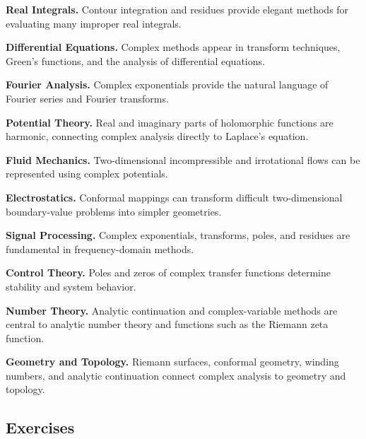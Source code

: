 \begin{applicationbox}
\textbf{Real Integrals.}
Contour integration and residues provide elegant methods for evaluating
many improper real integrals.

\medskip

\textbf{Differential Equations.}
Complex methods appear in transform techniques, Green's functions, and
the analysis of differential equations.

\medskip

\textbf{Fourier Analysis.}
Complex exponentials provide the natural language of Fourier series and
Fourier transforms.

\medskip

\textbf{Potential Theory.}
Real and imaginary parts of holomorphic functions are harmonic, connecting
complex analysis directly to Laplace's equation.

\medskip

\textbf{Fluid Mechanics.}
Two-dimensional incompressible and irrotational flows can be represented
using complex potentials.

\medskip

\textbf{Electrostatics.}
Conformal mappings can transform difficult two-dimensional boundary-value
problems into simpler geometries.

\medskip

\textbf{Signal Processing.}
Complex exponentials, transforms, poles, and residues are fundamental in
frequency-domain methods.

\medskip

\textbf{Control Theory.}
Poles and zeros of complex transfer functions determine stability and
system behavior.

\medskip

\textbf{Number Theory.}
Analytic continuation and complex-variable methods are central to analytic
number theory and functions such as the Riemann zeta function.

\medskip

\textbf{Geometry and Topology.}
Riemann surfaces, conformal geometry, winding numbers, and analytic
continuation connect complex analysis to geometry and topology.
\end{applicationbox}

\subsection{Exercises}
\label{subsec:complex-analysis-exercises}

